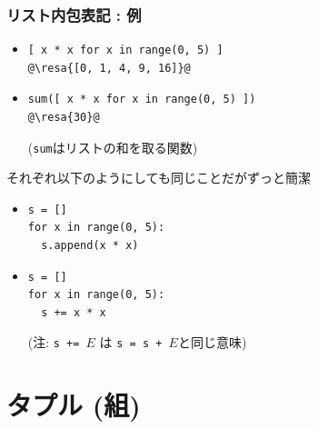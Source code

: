 \documentclass[10pt,dvipdfmx]{beamer}
\newcommand{\ore}[1]{{\color{orange}#1}}
\newcommand{\resa}[1]{\ore{\textsl{$\rightarrow$ #1}}}
\begin{document}
\begin{frame}[fragile]
\frametitle{リスト内包表記 : 例}
\begin{itemize}
\item []
\begin{lstlisting}
[ x * x for x in range(0, 5) ]
@\resa{[0, 1, 4, 9, 16]}@
\end{lstlisting}

\item []
\begin{lstlisting}
sum([ x * x for x in range(0, 5) ])
@\resa{30}@
\end{lstlisting}
({\tt sum}はリストの和を取る関数)

\end{itemize}

それぞれ以下のようにしても同じことだがずっと簡潔
\begin{itemize}
\item []
\begin{lstlisting}
s = []
for x in range(0, 5):
  s.append(x * x)
\end{lstlisting}

\item []
\begin{lstlisting}
s = []
for x in range(0, 5):
  s += x * x
\end{lstlisting}
(注: {\tt s += $E$} は {\tt s = s + $E$}と同じ意味)

\end{itemize}
\end{frame}


\section{タプル (組)}
\end{document}

